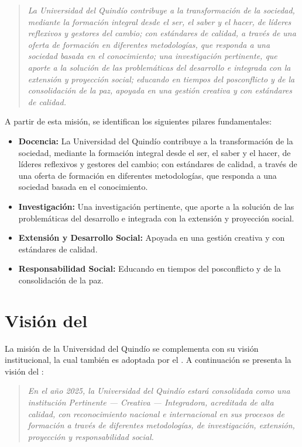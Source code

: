 \begin{quote}
	\textit{La Universidad del Quindío contribuye a la transformación de la sociedad, mediante la formación integral desde el ser, el saber y el hacer, de líderes reflexivos y gestores del cambio; con estándares de calidad, a través de una oferta de formación en diferentes metodologías, que responda a una sociedad basada en el conocimiento; una investigación pertinente, que aporte a la solución de las problemáticas del desarrollo e integrada con la extensión y proyección social; educando en tiempos del posconflicto y de la consolidación de la paz, apoyada en una gestión creativa y con estándares de calidad.}
\end{quote}

A partir de esta misión, se identifican los siguientes pilares fundamentales:

\begin{itemize}
	\item \textbf{Docencia:} La Universidad del Quindío contribuye a la transformación de la sociedad, mediante la formación integral desde el ser, el saber y el hacer, de líderes reflexivos y gestores del cambio; con estándares de calidad, a través de una oferta de formación en diferentes metodologías, que responda a una sociedad basada en el conocimiento.

	\item \textbf{Investigación:} Una investigación pertinente, que aporte a la solución de las problemáticas del desarrollo e integrada con la extensión y proyección social.

	\item \textbf{Extensión y Desarrollo Social:} Apoyada en una gestión creativa y con estándares de calidad.

	\item \textbf{Responsabilidad Social:} Educando en tiempos del posconflicto y de la consolidación de la paz.
\end{itemize}

\section{Visión del \GRID}
La misión de la Universidad del Quindío se complementa con su visión institucional, la cual también es adoptada por el \GRID. A continuación se presenta la visión del \GRID:\@

\begin{quote}
	\textit{En el año 2025, la Universidad del Quindío estará consolidada como una institución \textit{Pertinente --- Creativa --- Integradora}, acreditada de alta calidad, con reconocimiento nacional e internacional en sus procesos de formación a través de diferentes metodologías, de investigación, extensión, proyección y responsabilidad social.}
\end{quote}

